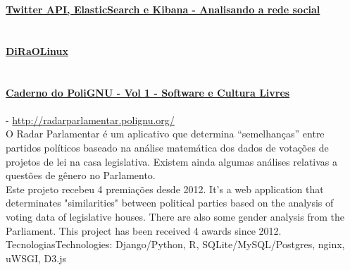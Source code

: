 \documentclass[]{friggeri-cv}
\begin{document}
{\href{http://polignu.org/artigo/twitter-api-elasticsearch-e-kibana-analisando-rede-social}{\textbf{Twitter API, ElasticSearch e Kibana - Analisando a rede social}}\\
\emph{}\\}\\
{\href{http://diraol.polignu.org}{\textbf{DiRaOLinux}}\\
\emph{}\\}\\
\href{http://polignu.org/administrativo/caderno-polignu-volume-1-software-e-culturas-livres}{\textbf{Caderno do PoliGNU - Vol 1 - Software e Cultura Livres}}\\
\emph{}\\

\textbf{} - \href{http://radarparlamentar.polignu.org/}{http://radarparlamentar.polignu.org/}\\
%
{O Radar Parlamentar é um aplicativo que determina ``semelhanças'' entre partidos \nohyphens{políticos} baseado na análise matemática dos dados de votações de projetos de lei na casa \nohyphens{legislativa}. Existem ainda algumas análises relativas a questões de gênero no Parlamento.\\
Este projeto recebeu 4 premiações desde 2012.}%
{It's a web application that determinates "similarities" between political parties based on the analysis of voting data of legislative houses. There are also some gender analysis from the Parliament. 
This project has been received 4 awards since 2012.}\\
%
{Tecnologias}{Technologies}: Django/Python, R, SQLite/MySQL/Postgres, nginx, uWSGI, D3.js
\end{document}
